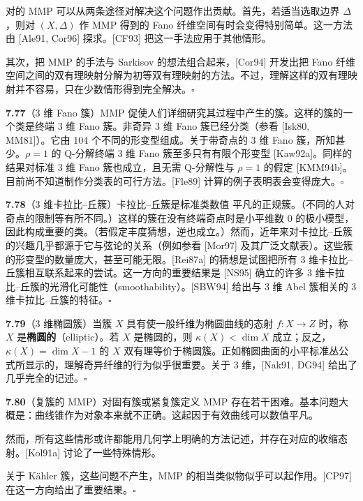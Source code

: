 对的 MMP 可以从两条途径对解决这个问题作出贡献。首先，若适当选取边界 $\Delta$，则对 $(X,\Delta)$ 作 MMP 得到的 Fano 纤维空间有时会变得特别简单。这一方法由 [Ale91, Cor96] 探求。[CF93] 把这一手法应用于其他情形。

其次，把 MMP 的手法与 Sarkisov 的想法组合起来，[Cor94] 开发出把 Fano 纤维空间之间的双有理映射分解为初等双有理映射的方法。不过，理解这样的双有理映射并不容易，只在少数情形得到完全解决。\hfill$\square$

\par\medskip\noindent\textbf{7.77}（3 维 Fano 簇）\quad MMP 促使人们详细研究其过程中产生的簇。这样的簇的一个类是终端 3 维 Fano 簇。非奇异 3 维 Fano 簇已经分类（参看 [Isk80, MM81]）。它由 104 个不同的形变型组成。关于带奇点的 3 维 Fano 簇，所知甚少。$\rho=1$ 的 Q-分解终端 3 维 Fano 簇至多只有有限个形变型 [Kaw92a]。同样的结果对标准 3 维 Fano 簇也成立，且无需 Q-分解性与 $\rho=1$ 的假定 [KMM94b]。目前尚不知道制作分类表的可行方法。[Fle89] 计算的例子表明表会变得庞大。\hfill$\square$

\par\medskip\noindent\textbf{7.78}（3 维卡拉比--丘簇）\quad 卡拉比--丘簇是标准类数值
平凡的正规簇。（不同的人对奇点的限制等有所不同。）这样的簇在没有终端奇点时是小平维数 0 的极小模型，因此构成重要的类。（若假定丰度猜想，逆也成立。）然而，近年来对卡拉比--丘簇的兴趣几乎都源于它与弦论的关系（例如参看 [Mor97] 及其广泛文献表）。这些簇的形变型的数量庞大，甚至可能无限。[Rei87a] 的猜想是试图把所有 3 维卡拉比--丘簇相互联系起来的尝试。这一方向的重要结果是 [NS95] 确立的许多 3 维卡拉比--丘簇的光滑化可能性（smoothability）。[SBW94] 给出与 3 维 Abel 簇相关的 3 维卡拉比--丘簇的特征。\hfill$\square$

\par\medskip\noindent\textbf{7.79}（3 维椭圆簇）\quad 当簇 $X$ 具有使一般纤维为椭圆曲线的态射 $f\colon X\to Z$ 时，称 $X$ 是\textbf{椭圆的}（elliptic）。若 $X$ 是椭圆的，则 $\kappa(X)<\dim X$ 成立；反之，$\kappa(X)=\dim X-1$ 的 $X$ 双有理等价于椭圆簇。正如椭圆曲面的小平标准丛公式所显示的，理解奇异纤维的行为似乎很重要。关于 3 维，[Nak91, DG94] 给出了几乎完全的记述。\hfill$\square$

\par\medskip\noindent\textbf{7.80}（复簇的 MMP）\quad 对固有簇或紧复簇定义 MMP 存在若干困难。基本问题大概是：曲线锥作为对象本来就不正确。这起因于有效曲线可以数值平凡。

然而，所有这些情形或许都能用几何学上明确的方法记述，并存在对应的收缩态射。[Kol91a] 讨论了一些特殊情形。

关于 Kähler 簇，这些问题不产生，MMP 的相当类似物似乎可以起作用。[CP97] 在这一方向给出了重要结果。\hfill$\square$

